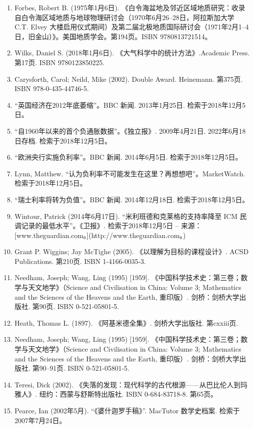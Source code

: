 \begin{enumerate}
\item Forbes, Robert B. (1975年1月6日). 《白令海盆地及邻近区域地质研究：收录自白令海区域地质与地球物理研讨会（1970年6月26–28日，阿拉斯加大学 C.T. Elvey 大楼启用仪式期间）及第二届北极地质国际研讨会（1971年2月1–4日，旧金山）》。美国地质学会。第194页。ISBN 9780813721514。
\item Wilks, Daniel S. (2018年1月6日). 《大气科学中的统计方法》.Academic Press. 第17页. ISBN 9780123850225.
\item Carysforth, Carol; Neild, Mike (2002). Double Award. Heinemann. 第375页. ISBN 978-0-435-44746-5.
\item “英国经济在2012年底萎缩”。BBC 新闻. 2013年1月25日. 检索于2018年12月5日。
\item “自1960年以来的首个负通胀数据”。《独立报》. 2009年4月21日. 2022年6月18日存档. 检索于2018年12月5日。
\item “欧洲央行实施负利率”。BBC 新闻. 2014年6月5日. 检索于2018年12月5日。
\item Lynn, Matthew. “认为负利率不可能发生在这里？再想想吧”。MarketWatch. 检索于2018年12月5日。
\item “瑞士利率将转为负值”。BBC 新闻. 2014年12月18日. 检索于2018年12月5日。
\item Wintour, Patrick (2014年6月17日). “米利班德和克莱格的支持率降至 ICM 民调记录的最低水平”。《卫报》. 检索于2018年12月5日 – 来源：[www.theguardian.com。](http://www.theguardian.com。)
\item Grant P. Wiggins; Jay McTighe (2005). 《以理解为目标的课程设计》. ACSD Publications. 第210页. ISBN 1-4166-0035-3.
\item Needham, Joseph; Wang, Ling (1995) [1959]. 《中国科学技术史：第三卷；数学与天文地学》（Science and Civilisation in China: Volume 3; Mathematics and the Sciences of the Heavens and the Earth, 重印版）. 剑桥：剑桥大学出版社. 第90页. ISBN 0-521-05801-5.
\item Heath, Thomas L. (1897). 《阿基米德全集》. 剑桥大学出版社. 第cxxiii页.
\item Needham, Joseph; Wang, Ling (1995) [1959]. 《中国科学技术史：第三卷；数学与天文地学》（Science and Civilisation in China: Volume 3; Mathematics and the Sciences of the Heavens and the Earth, 重印版）. 剑桥：剑桥大学出版社. 第90–91页. ISBN 0-521-05801-5.
\item Teresi, Dick (2002). 《失落的发现：现代科学的古代根源——从巴比伦人到玛雅人》. 纽约：西蒙与舒斯特出版社. ISBN 0-684-83718-8. 第65页。
\item Pearce, Ian (2002年5月). “《婆什迦罗手稿》”. MacTutor 数学史档案. 检索于2007年7月24日。

\end{enumerate}
